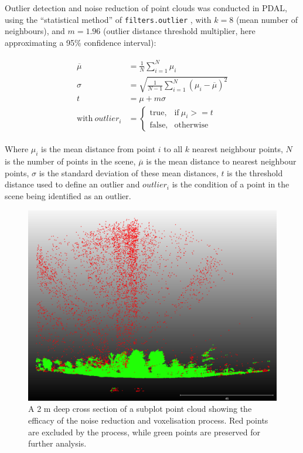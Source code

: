 \documentclass[11pt,a4paper]{article}
\begin{document}
Outlier detection and noise reduction of point clouds was conducted in PDAL, using the ``statistical method'' of \texttt{filters.outlier} \citep{Rusu2008}, with $k = 8$ (mean number of neighbours), and $m = 1.96$ (outlier distance threshold multiplier, here approximating a 95\% confidence interval):

\begin{align}
\begin{split}
	\overline{\mu} &= \frac{1}{N} \sum_{i=1}^{N} \mu_{i} \\
	\sigma &= \sqrt{\frac{1}{N-1} \sum_{i=1}^{N}(\mu_{i} - \overline{\mu{}})^2} \\
	t &= \mu + m \sigma \\
	\text{with}\ outlier_{i} &= 
		\begin{cases}
			\text{true},& \text{if}\ \mu_{i} >= t \\
			\text{false},& \text{otherwise}
		\end{cases}
\end{split}
\end{align}

Where $\mu_{i}$ is the mean distance from point $i$ to all $k$ nearest neighbour points, $N$ is the number of points in the scene, $\overline{\mu}$ is the mean distance to nearest neighbour points, $\sigma$ is the standard deviation of these mean distances, $t$ is the threshold distance used to define an outlier and $outlier_{i}$ is the condition of a point in the scene being identified as an outlier.

\begin{figure}
\centering
	\includegraphics[width=0.7\linewidth]{noise_vis}
	\caption{A 2 m deep cross section of a subplot point cloud showing the efficacy of the noise reduction and voxelisation process. Red points are excluded by the process, while green points are preserved for further analysis.}
	\label{noise_vis}
\end{figure}
\end{document}

